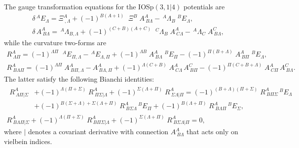 \documentclass[a4paper,12pt]{article}
\newcommand{\La}{\ensuremath{\Lambda}}
\newcommand{\de}{\ensuremath{\delta}}
\newcommand{\Si}{\ensuremath{\Sigma}}
\begin{document}
The gauge transformation equations for the IOSp$(3,1|4)$ potentials are
\begin{gather}
\de\,^A\!E_\La=\Xi^A_{\ ,\La}+(-1)^{B(A+1)}\;\;\Xi^B\;A^A_{\ B\La}-\,^A\!\La_B\;^B\!E_\La,  \label{etrans} \\
\de\,A^A_{\ B\La}=\,^A\!\La_{B,\La}+(-1)^{(C+B)(A+C)}\;\;^C\!\La_B\;A^A_{\ C\La}-\,^A\!\La_C\;A^C_{\ B\La}, \label{atrans}
\end{gather}
while the curvature two-forms are
\begin{gather}
R^A_{\ \La\Pi}=(-1)^{\La\Pi}\;\;^A\!E_{\Pi,\La}-\,^A\!E_{\La,\Pi}+(-1)^{\La B}\;A^A_{\ B\La}\;^B\!E_\Pi-(-1)^{\Pi(B+\La)}\;A^A_{\ B\Pi}\;^B\!E_\La, \label{Tor} \\
R^A_{\ B\La\Pi}=(-1)^{\La\Pi}\; A^A_{\ B\Pi,\La}-A^A_{\ B\La,\Pi}+(-1)^{\La(C+B)}\; A^A_{\ C\La}\,A^C_{\ B\Pi}-(-1)^{\Pi(C+B+\La)}\; A^A_{\ C\Pi}\,A^C_{\ B\La}. \label{Cur}
\end{gather}
The latter satisfy the following Bianchi identities:
\begin{gather}
\begin{split}
R^A_{\ \La\Pi|\Si}&+(-1)^{\La(\Pi+\Si)}\;R^A_{\ \Pi\Si|\La}+(-1)^{\Si(\La+\Pi)}\;R^A_{\ \Si\La|\Pi}=(-1)^{(B+\La)(\Pi+\Si)}\;R^A_{\ B\Pi\Si}\,^B\!E_\La  \\
&+(-1)^{B(\Si+\La)+\Si(\La+\Pi)}\;R^A_{\ B\Si\La}\,^B\!E_\Pi+(-1)^{B(\La+\Pi)}\;R^A_{\ B\La\Pi}\,^B\!E_\Si,
\end{split}  \label{bian1}  \\[8pt]
R^A_{\ B\La\Pi|\Si}+(-1)^{\La(\Pi+\Si)}\;R^A_{\ B\Pi\Si|\La}+(-1)^{\Si(\La+\Pi)}\;R^A_{\ B\Si\La|\Pi}=0,  \label{bian2}
\end{gather}
where $\scriptstyle |$ denotes a covariant derivative with connection $A^A_{\ B\La}$ that acts only on vielbein indices.
\end{document}
